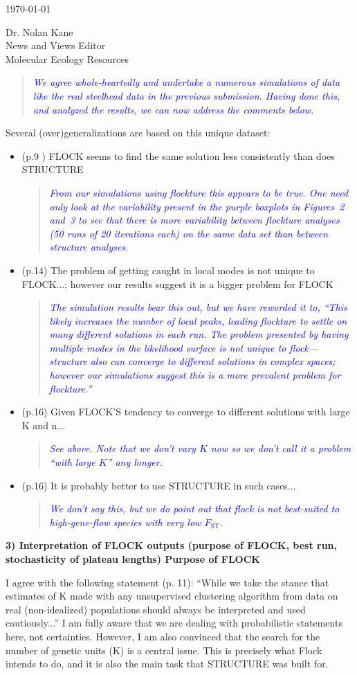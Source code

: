 \documentclass[11pt]{letter}
\newcommand{\reply}[1]{\begin{quotation}\small\sl\textcolor{blue}{#1}\end{quotation}}
\begin{document}
\begin{letter}{ \today 

Dr. Nolan Kane\\
News and Views Editor\\
Molecular Ecology Resources \\
}
\reply{We agree whole-heartedly and undertake a numerous simulations of data like the real
steelhead data in the previous submission.  Having done this, and analyzed the results,
we can now address the comments below.}
Several (over)generalizations are based on this unique dataset:
\begin{itemize}
\item (p.9 ) FLOCK seems to find the same solution less consistently than does STRUCTURE
\reply{From our simulations using {\sc flockture} this appears to be true.  One need only look
at the variability present in the purple boxplots in Figures~2 and~3 to see that there is more
variability between {\sc flockture} analyses (50 runs of 20 iterations each) on the same data set 
than between {\sc structure} analyses. }
\item (p.14) The problem of getting caught in local modes is not unique to FLOCK...; however our results suggest it is a bigger problem for FLOCK
\reply{The simulation results bear this out, but we have reworded it to, ``This likely 
increases the number of
local peaks, leading {\sc flockture} to settle on many different solutions in 
each run. The problem presented by having multiple modes in the likelihood surface 
is not unique to {\sc flock}---{\sc structure} also can converge to 
different solutions in complex spaces; however our simulations suggest this is a more  
prevalent problem for {\sc flockture}.''
}
\item (p.16) Given FLOCK'S tendency to converge to different solutions with large K and n...
\reply{See above.  Note that we don't vary $K$ now so we don't call it a problem ``with large $K$'' any
longer.}
\item (p.16) It is probably better to use STRUCTURE in such cases...
\reply{We don't say this, but we do point out that {\sc flock} is not best-suited to high-gene-flow
species with very low $F_\mathrm{ST}$.}
\end{itemize}

{\bf 3) Interpretation of FLOCK outputs (purpose of FLOCK, best run, stochasticity of plateau lengths)
Purpose of FLOCK}

I agree with the following statement (p. 11):
``While we take the stance that estimates of K made with any unsupervised clustering algorithm from data on real (non-idealized) populations should always be interpreted and used cautiously...''
I am fully aware that we are dealing with probabilistic statements here, not certainties. However, I am also convinced that the search for the number of genetic units (K) is a central issue. This is precisely what Flock intends to do, and it is also the main task that STRUCTURE was built for.


\end{letter}
\end{document}
